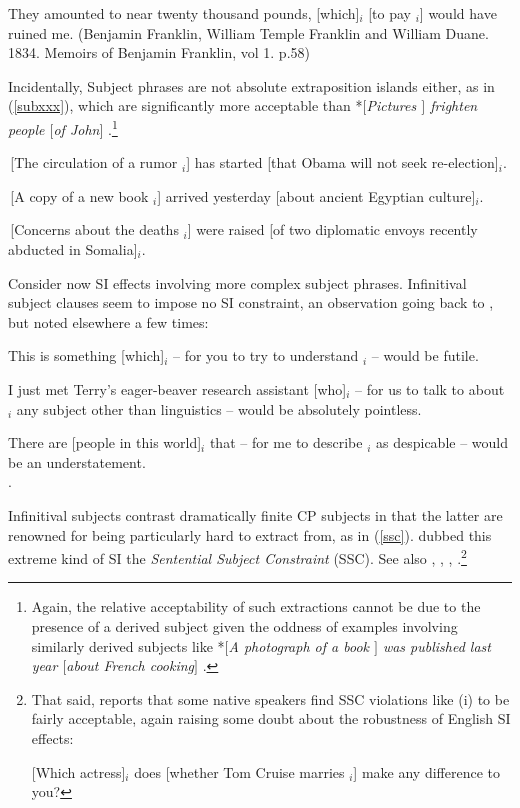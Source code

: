 \documentclass[output=paper]{langsci/langscibook}
\begin{document}
 \ex
 They amounted to near twenty thousand pounds, [which]$_i$ [to pay \spc$_i$] would have ruined me. 
(Benjamin Franklin, William Temple
Franklin and  William Duane.
1834.  Memoirs of Benjamin Franklin, vol 1. 
p.58)
\z \label{vpsia}
\z 




Incidentally, Subject phrases are not absolute extraposition islands either, as in (\ref{subxxx}),
which  are significantly  more acceptable than  *\emph{$[$Pictures \spc$]$ frighten people $[$of John$]$}  \citep{drummond}.\footnote{Again, the relative acceptability of such extractions
cannot be due to the presence of a derived subject given the oddness
of examples involving similarly derived subjects  like  *\emph{$[$A photograph of a book \spc$]$ was published last year $[$about French cooking$]$} \citep{akma75}.}




\ea
\ea
\,[The circulation of a rumor \spc$_i$]
has started [that Obama will not seek re-election]$_i$.

\item \,[A  copy of a new book \spc$_i$] arrived
yesterday [about ancient Egyptian culture]$_i$.

\item \,[Concerns about the deaths  \spc$_i$] were
raised [of two diplomatic envoys recently abducted in Somalia]$_i$.
\z \label{subxxx}
\z


Consider now SI effects involving more complex subject phrases.
Infinitival subject clauses seem to impose no SI constraint, an observation going
back to \citet{kunotakamib}, but noted elsewhere a few times:

\ea
\ea This is something [which]$_i$  -- for you to try to understand \spc$_i$ -- would be futile.\\
\citep[49]{kunotakamib}

\ex I just met Terry's eager-beaver research assistant [who]$_i$ -- for us
to talk to about \spc$_i$ any subject other than linguistics -- would be absolutely pointless.\\
\citep[265]{levhubook}

\item There are [people in this world]$_i$ that --  for me to describe \spc$_i$ as despicable 
 -- would be an understatement.\\
 \citep[471]{chavesextr}.

\z \label{vpsi}
\z




\noindent
Infinitival subjects contrast dramatically  finite CP subjects in that the 
latter are renowned for being particularly hard to extract from,  as in  (\ref{ssc}).
  \citet{Ross67} dubbed this extreme kind of SI the  \emph{Sentential Subject Constraint} (SSC). See also  \citet{chomsky73}, \citet{huang82},  \citet{Chomsky86b}, \citet{freidin92}.\footnote{That said, \citet{chavessubj} reports that some native speakers find SSC violations like  (i) to be fairly acceptable, again raising some doubt about the robustness of English SI effects:

\ea
{}[Which actress]$_i$ does [whether Tom Cruise marries \spc$_i$] make any difference to you?
\zlast
}
\end{document}
